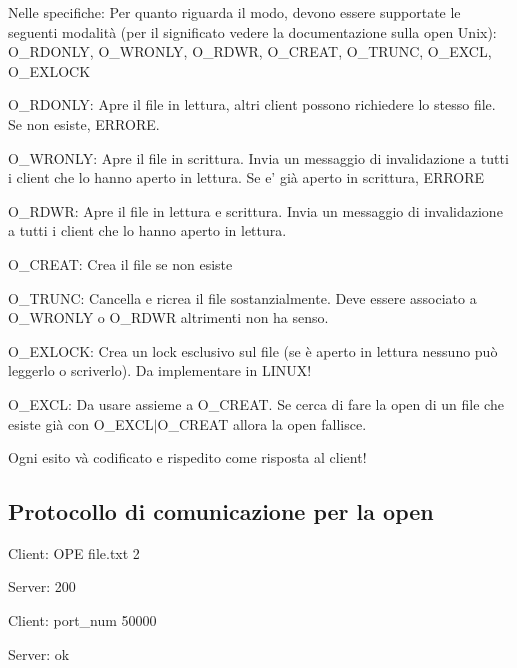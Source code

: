 Nelle specifiche\+: Per quanto riguarda il modo, devono essere supportate le seguenti modalità (per il significato vedere la documentazione sulla open Unix)\+: O\+\_\+\+R\+D\+O\+N\+L\+Y, O\+\_\+\+W\+R\+O\+N\+L\+Y, O\+\_\+\+R\+D\+W\+R, O\+\_\+\+C\+R\+E\+A\+T, O\+\_\+\+T\+R\+U\+N\+C, O\+\_\+\+E\+X\+C\+L, O\+\_\+\+E\+X\+L\+O\+C\+K


\begin{DoxyItemize}
\item O\+\_\+\+R\+D\+O\+N\+L\+Y\+: Apre il file in lettura, altri client possono richiedere lo stesso file. Se non esiste, E\+R\+R\+O\+R\+E.
\item O\+\_\+\+W\+R\+O\+N\+L\+Y\+: Apre il file in scrittura. Invia un messaggio di invalidazione a tutti i client che lo hanno aperto in lettura. Se e' già aperto in scrittura, E\+R\+R\+O\+R\+E
\item O\+\_\+\+R\+D\+W\+R\+: Apre il file in lettura e scrittura. Invia un messaggio di invalidazione a tutti i client che lo hanno aperto in lettura.
\item O\+\_\+\+C\+R\+E\+A\+T\+: Crea il file se non esiste
\item O\+\_\+\+T\+R\+U\+N\+C\+: Cancella e ricrea il file sostanzialmente. Deve essere associato a O\+\_\+\+W\+R\+O\+N\+L\+Y o O\+\_\+\+R\+D\+W\+R altrimenti non ha senso.
\item O\+\_\+\+E\+X\+L\+O\+C\+K\+: Crea un lock esclusivo sul file (se è aperto in lettura nessuno può leggerlo o scriverlo). Da implementare in L\+I\+N\+U\+X!
\item O\+\_\+\+E\+X\+C\+L\+: Da usare assieme a O\+\_\+\+C\+R\+E\+A\+T. Se cerca di fare la open di un file che esiste già con O\+\_\+\+E\+X\+C\+L$\vert$\+O\+\_\+\+C\+R\+E\+A\+T allora la open fallisce.
\end{DoxyItemize}

Ogni esito và codificato e rispedito come risposta al client! 

 \subsection*{Protocollo di comunicazione per la open}


\begin{DoxyEnumerate}
\item Client\+: O\+P\+E file.\+txt 2
\item Server\+: 200
\item Client\+: port\+\_\+num 50000
\item Server\+: ok
\end{DoxyEnumerate}

